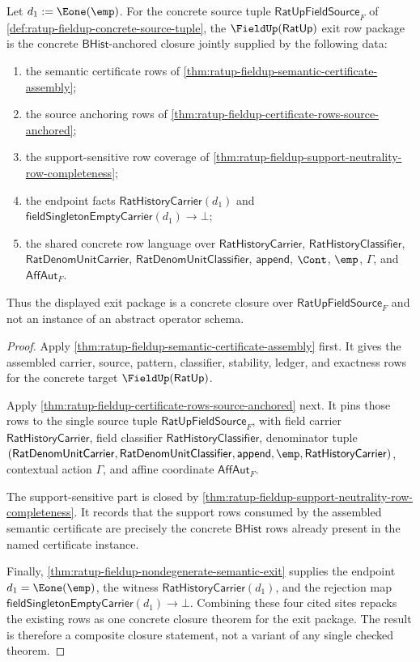 \begin{theorem}
\label{thm:ratup-fieldup-concrete-exit-row-closure}
Let $d_1:=\Eone(\emp)$. For the concrete source tuple
$\mathsf{RatUpFieldSource}_F$ of
\autoref{def:ratup-fieldup-concrete-source-tuple}, the
$\FieldUp(\mathsf{RatUp})$ exit row package is the concrete
$\mathsf{BHist}$-anchored closure jointly supplied by the following data:
\begin{enumerate}
  \item the semantic certificate rows of
  \autoref{thm:ratup-fieldup-semantic-certificate-assembly};
  \item the source anchoring rows of
  \autoref{thm:ratup-fieldup-certificate-rows-source-anchored};
  \item the support-sensitive row coverage of
  \autoref{thm:ratup-fieldup-support-neutrality-row-completeness};
  \item the endpoint facts $\mathsf{RatHistoryCarrier}(d_1)$ and
  $\mathsf{fieldSingletonEmptyCarrier}(d_1)\to\bot$;
  \item the shared concrete row language over
  $\mathsf{RatHistoryCarrier}$, $\mathsf{RatHistoryClassifier}$,
  $\mathsf{RatDenomUnitCarrier}$, $\mathsf{RatDenomUnitClassifier}$,
  $\mathsf{append}$, $\Cont$, $\emp$, $\Gamma$, and $\mathsf{AffAut}_F$.
\end{enumerate}
Thus the displayed exit package is a concrete closure over
$\mathsf{RatUpFieldSource}_F$ and not an instance of an abstract operator schema.
\end{theorem}
\begin{proof}
Apply \autoref{thm:ratup-fieldup-semantic-certificate-assembly} first. It gives
the assembled carrier, source, pattern, classifier, stability, ledger, and
exactness rows for the concrete target $\FieldUp(\mathsf{RatUp})$.

Apply \autoref{thm:ratup-fieldup-certificate-rows-source-anchored} next. It pins
those rows to the single source tuple $\mathsf{RatUpFieldSource}_F$, with field
carrier $\mathsf{RatHistoryCarrier}$, field classifier
$\mathsf{RatHistoryClassifier}$, denominator tuple
$(\mathsf{RatDenomUnitCarrier},\mathsf{RatDenomUnitClassifier},
\mathsf{append},\emp,\mathsf{RatHistoryCarrier})$, contextual action $\Gamma$,
and affine coordinate $\mathsf{AffAut}_F$.

The support-sensitive part is closed by
\autoref{thm:ratup-fieldup-support-neutrality-row-completeness}. It records that
the support rows consumed by the assembled semantic certificate are precisely
the concrete $\mathsf{BHist}$ rows already present in the named certificate
instance.

Finally, \autoref{thm:ratup-fieldup-nondegenerate-semantic-exit} supplies the
endpoint $d_1=\Eone(\emp)$, the witness
$\mathsf{RatHistoryCarrier}(d_1)$, and the rejection map
$\mathsf{fieldSingletonEmptyCarrier}(d_1)\to\bot$. Combining these four cited
sites repacks the existing rows as one concrete closure theorem for the exit
package. The result is therefore a composite closure statement, not a variant of
any single checked theorem.
\end{proof}

